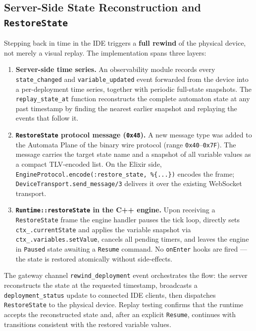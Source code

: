 \subsection*{Server-Side State Reconstruction and \texttt{RestoreState}}
\label{sec:restore-state}

Stepping back in time in the IDE triggers a \textbf{full rewind} of the physical device, not merely a visual replay. The implementation spans three layers:

\begin{enumerate}
  \item \textbf{Server-side time series.} An observability module records
    every \texttt{state\_changed} and \texttt{variable\_updated} event forwarded
    from the device into a per-deployment time series, together with periodic
    full-state snapshots.  The \texttt{replay\_state\_at} function
    reconstructs the complete automaton state at any past timestamp by finding
    the nearest earlier snapshot and replaying the events that follow it.

  \item \textbf{\texttt{RestoreState} protocol message (\texttt{0x48}).} A new message type
    was added to the Automata Plane of the binary wire protocol
    (range \texttt{0x40}--\texttt{0x7F}).  The message carries the target state name and a
    snapshot of all variable values as a compact TLV-encoded list.  On the Elixir side,
    \texttt{EngineProtocol.encode(:restore\_state, \%\{...\})} encodes the frame;
    \texttt{DeviceTransport.send\_message/3} delivers it over the existing WebSocket
    transport.

  \item \textbf{\texttt{Runtime::restoreState} in the C++ engine.} Upon receiving a
    \texttt{RestoreState} frame the engine handler pauses the tick loop, directly sets
    \texttt{ctx\_.currentState} and applies the variable snapshot via
    \texttt{ctx\_.variables.setValue}, cancels all pending timers, and leaves the engine in
    \texttt{Paused} state awaiting a \texttt{Resume} command.  No \texttt{onEnter} hooks are
    fired — the state is restored atomically without side-effects.
\end{enumerate}

\noindent The gateway channel \texttt{rewind\_deployment} event orchestrates the flow: the
server reconstructs the state at the requested timestamp, broadcasts a
\texttt{deployment\_status} update to connected IDE clients, then dispatches
\texttt{RestoreState} to the physical device.  Replay testing confirms that the
runtime accepts the reconstructed state and, after an explicit \texttt{Resume},
continues with transitions consistent with the restored variable values.


